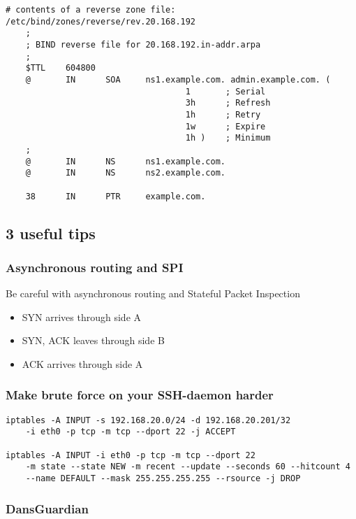 \documentclass{article}
\begin{document}
\begin{verbatim}
# contents of a reverse zone file:
/etc/bind/zones/reverse/rev.20.168.192
    ;
    ; BIND reverse file for 20.168.192.in-addr.arpa
    ;
    $TTL    604800
    @       IN      SOA     ns1.example.com. admin.example.com. (
                                    1       ; Serial
                                    3h      ; Refresh
                                    1h      ; Retry
                                    1w      ; Expire
                                    1h )    ; Minimum
    ;
    @       IN      NS      ns1.example.com.
    @       IN      NS      ns2.example.com.

    38      IN      PTR     example.com.
\end{verbatim}


\subsection{3 useful tips}

\subsubsection{Asynchronous routing and SPI}

Be careful with asynchronous routing and Stateful Packet Inspection

\begin{itemize}
    \item SYN arrives through side A
    \item SYN, ACK leaves through side B
    \item ACK arrives through side A
\end{itemize}

\subsubsection{Make brute force on your SSH-daemon harder}

\begin{verbatim}
iptables -A INPUT -s 192.168.20.0/24 -d 192.168.20.201/32 
    -i eth0 -p tcp -m tcp --dport 22 -j ACCEPT

iptables -A INPUT -i eth0 -p tcp -m tcp --dport 22 
    -m state --state NEW -m recent --update --seconds 60 --hitcount 4 
    --name DEFAULT --mask 255.255.255.255 --rsource -j DROP
\end{verbatim}

\subsubsection{DansGuardian}
\end{document}
